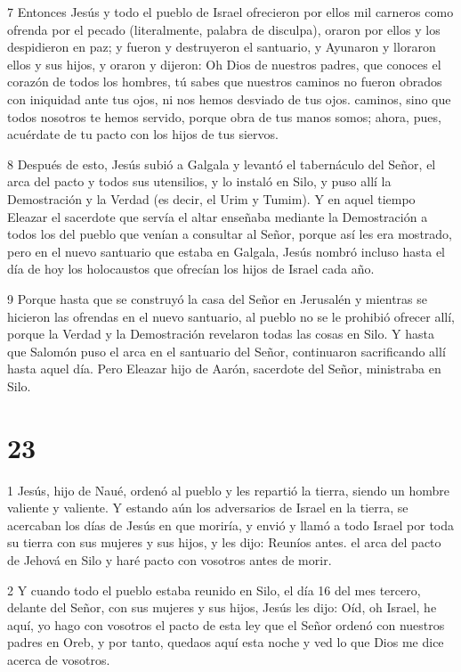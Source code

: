 \par 7 Entonces Jesús y todo el pueblo de Israel ofrecieron por ellos mil carneros como ofrenda por el pecado (literalmente, palabra de disculpa), oraron por ellos y los despidieron en paz; y fueron y destruyeron el santuario, y Ayunaron y lloraron ellos y sus hijos, y oraron y dijeron: Oh Dios de nuestros padres, que conoces el corazón de todos los hombres, tú sabes que nuestros caminos no fueron obrados con iniquidad ante tus ojos, ni nos hemos desviado de tus ojos. caminos, sino que todos nosotros te hemos servido, porque obra de tus manos somos; ahora, pues, acuérdate de tu pacto con los hijos de tus siervos.

\par 8 Después de esto, Jesús subió a Galgala y levantó el tabernáculo del Señor, el arca del pacto y todos sus utensilios, y lo instaló en Silo, y puso allí la Demostración y la Verdad (es decir, el Urim y Tumim). Y en aquel tiempo Eleazar el sacerdote que servía el altar enseñaba mediante la Demostración a todos los del pueblo que venían a consultar al Señor, porque así les era mostrado, pero en el nuevo santuario que estaba en Galgala, Jesús nombró incluso hasta el día de hoy los holocaustos que ofrecían los hijos de Israel cada año.

\par 9 Porque hasta que se construyó la casa del Señor en Jerusalén y mientras se hicieron las ofrendas en el nuevo santuario, al pueblo no se le prohibió ofrecer allí, porque la Verdad y la Demostración revelaron todas las cosas en Silo. Y hasta que Salomón puso el arca en el santuario del Señor, continuaron sacrificando allí hasta aquel día. Pero Eleazar hijo de Aarón, sacerdote del Señor, ministraba en Silo.



\chapter{23}

\par 1 Jesús, hijo de Naué, ordenó al pueblo y les repartió la tierra, siendo un hombre valiente y valiente. Y estando aún los adversarios de Israel en la tierra, se acercaban los días de Jesús en que moriría, y envió y llamó a todo Israel por toda su tierra con sus mujeres y sus hijos, y les dijo: Reuníos antes. el arca del pacto de Jehová en Silo y haré pacto con vosotros antes de morir.

\par 2 Y cuando todo el pueblo estaba reunido en Silo, el día 16 del mes tercero, delante del Señor, con sus mujeres y sus hijos, Jesús les dijo: Oíd, oh Israel, he aquí, yo hago con vosotros el pacto de esta ley que el Señor ordenó con nuestros padres en Oreb, y por tanto, quedaos aquí esta noche y ved lo que Dios me dice acerca de vosotros.

